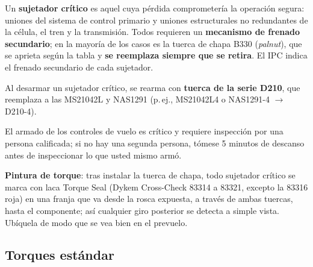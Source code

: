 Un \textbf{sujetador crítico} es aquel cuya pérdida comprometería la operación segura: uniones del sistema de control primario y uniones estructurales no redundantes de la célula, el tren y la transmisión. Todos requieren un \textbf{mecanismo de frenado secundario}; en la mayoría de los casos es la tuerca de chapa B330 (\emph{palnut}), que se aprieta según la tabla y \textbf{se reemplaza siempre que se retira}. El IPC indica el frenado secundario de cada sujetador.

Al desarmar un sujetador crítico, se rearma con \textbf{tuerca de la serie D210}, que reemplaza a las MS21042L y NAS1291 (p.\,ej., MS21042L4 o NAS1291-4 $\rightarrow$ D210-4).

\begin{advertencia}
El armado de los controles de vuelo es crítico y requiere inspección por una persona calificada; si no hay una segunda persona, tómese 5 minutos de descanso antes de inspeccionar lo que usted mismo armó.
\end{advertencia}

\textbf{Pintura de torque}: tras instalar la tuerca de chapa, todo sujetador crítico se marca con laca Torque Seal (Dykem Cross-Check 83314 a 83321, excepto la 83316 roja) en una franja que va desde la rosca expuesta, a través de ambas tuercas, hasta el componente; así cualquier giro posterior se detecta a simple vista. Ubíquela de modo que se vea bien en el prevuelo.

\subsection{Torques estándar}

